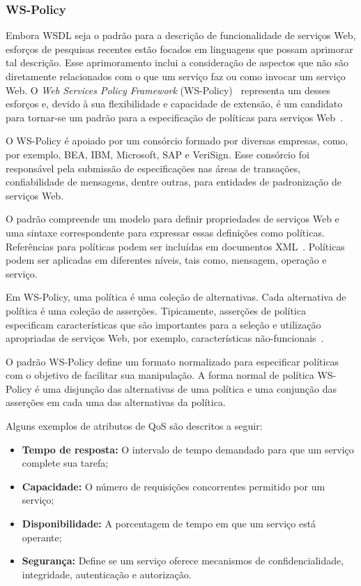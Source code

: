 \documentclass[12pt]{report} %
\begin{document}
	    \subsubsection{WS-Policy}
		Embora WSDL seja o padrão para a descrição de funcionalidade de serviços Web, esforços de pesquisas recentes estão focados em linguagens que possam aprimorar tal descrição.
		Esse aprimoramento inclui a consideração de aspectos que não são diretamente relacionados com o que um serviço faz ou como invocar um serviço Web.
		O \textit{Web Services Policy Framework} (WS-Policy)~\cite{wspolicy:website} representa um desses esforços e, devido à sua flexibilidade e capacidade de extensão, é um candidato para tornar-se um padrão para a especificação de políticas para serviços Web~\cite{Baresi06ws}.
		
		O WS-Policy é apoiado por um consórcio formado por diversas empresas, como, por exemplo, BEA, IBM, Microsoft, SAP e VeriSign.
		Esse consórcio foi responsável pela submissão de especificações nas áreas de transações, confiabilidade de mensagens, dentre outras, para entidades de padronização de serviços Web.
		
		O padrão compreende um modelo para definir propriedades de serviços Web e uma sintaxe correspondente para expressar essas definições como políticas.
		Referências para políticas podem ser incluídas em documentos XML~\cite{wspolicyattachment:website}.
		Políticas podem ser aplicadas em diferentes níveis, tais como, mensagem, operação e serviço.
		
		Em WS-Policy, uma política é uma coleção de alternativas.
		Cada alternativa de política é uma coleção de asserções.
		Tipicamente, asserções de política especificam características que são importantes para a seleção e utilização apropriadas de serviços Web, por exemplo, características não-funcionais~\cite{wspolicy:website}.
		
		O padrão WS-Policy define um formato normalizado para especificar políticas com o objetivo de facilitar sua manipulação.
		A forma normal de política WS-Policy é uma disjunção das alternativas de uma política e uma conjunção das asserções em cada uma das alternativas da política.
		
		Alguns exemplos de atributos de QoS são descritos a seguir:
		\begin{itemize}
		    \item \textbf{Tempo de resposta:} O intervalo de tempo demandado para que um serviço complete sua tarefa;
		    \item \textbf{Capacidade:} O número de requisições concorrentes permitido por um serviço;
		    \item \textbf{Disponibilidade:} A porcentagem de tempo em que um serviço está operante;
		    \item \textbf{Segurança:} Define se um serviço oferece mecanismos de confidencialidade, integridade, autenticação e autorização.
		\end{itemize}     	
\end{document}
